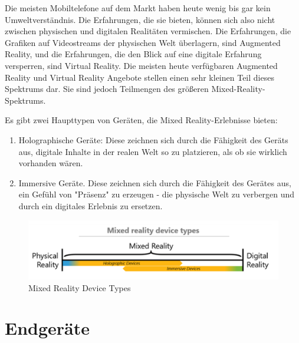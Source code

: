 Die meisten Mobiltelefone auf dem Markt haben heute wenig bis gar kein Umweltverständnis. Die Erfahrungen, die sie bieten, können sich also nicht zwischen physischen und digitalen Realitäten vermischen. Die Erfahrungen, die Grafiken auf Videostreams der physischen Welt überlagern, sind Augmented Reality, und die Erfahrungen, die den Blick auf eine digitale Erfahrung versperren, sind Virtual Reality. Die meisten heute verfügbaren Augmented Reality und Virtual Reality Angebote stellen einen sehr kleinen Teil dieses Spektrums dar. Sie sind jedoch Teilmengen des größeren Mixed-Reality-Spektrums. \newline 

\noindent Es gibt zwei Haupttypen von Geräten, die Mixed Reality-Erlebnisse bieten:
\begin{enumerate}[leftmargin=*,label= \arabic*:]
	 \item Holographische Geräte: Diese zeichnen sich durch die Fähigkeit des Geräts aus, digitale Inhalte in der realen Welt so zu platzieren, als ob sie wirklich vorhanden wären. 
	  \item Immersive Geräte. Diese zeichnen sich durch die Fähigkeit des Gerätes aus, ein Gefühl von "Präsenz" zu erzeugen - die physische Welt zu verbergen und durch ein digitales Erlebnis zu ersetzen.
\end{enumerate}

\begin{figure}[ht]
	\centering
	\includegraphics[width=\textwidth,height=\textheight,keepaspectratio]{images/Mixed Reality Device Types.png}
	\caption{Mixed Reality Device Types}
	\label{Mixed-Reality2}
\end{figure}

\section{Endgeräte}

